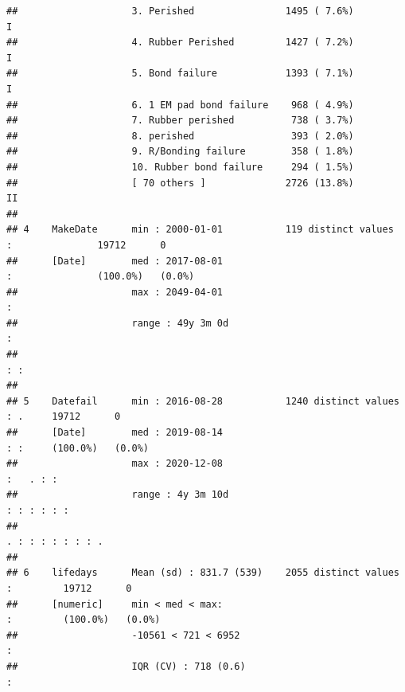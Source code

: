 \documentclass[nofonts,]{tufte-book}
\begin{document}
\begin{verbatim}
##                    3. Perished                1495 ( 7.6%)           I                                         
##                    4. Rubber Perished         1427 ( 7.2%)           I                                         
##                    5. Bond failure            1393 ( 7.1%)           I                                         
##                    6. 1 EM pad bond failure    968 ( 4.9%)                                                     
##                    7. Rubber perished          738 ( 3.7%)                                                     
##                    8. perished                 393 ( 2.0%)                                                     
##                    9. R/Bonding failure        358 ( 1.8%)                                                     
##                    10. Rubber bond failure     294 ( 1.5%)                                                     
##                    [ 70 others ]              2726 (13.8%)           II                                        
## 
## 4    MakeDate      min : 2000-01-01           119 distinct values          :               19712      0        
##      [Date]        med : 2017-08-01                                        :               (100.0%)   (0.0%)   
##                    max : 2049-04-01                                        :                                   
##                    range : 49y 3m 0d                                       :                                   
##                                                                          : :                                   
## 
## 5    Datefail      min : 2016-08-28           1240 distinct values                 : .     19712      0        
##      [Date]        med : 2019-08-14                                                : :     (100.0%)   (0.0%)   
##                    max : 2020-12-08                                          :   . : :                         
##                    range : 4y 3m 10d                                       : : : : : :                         
##                                                                        . : : : : : : : .                       
## 
## 6    lifedays      Mean (sd) : 831.7 (539)    2055 distinct values               :         19712      0        
##      [numeric]     min < med < max:                                              :         (100.0%)   (0.0%)   
##                    -10561 < 721 < 6952                                           :                             
##                    IQR (CV) : 718 (0.6)                                          :                             

\end{verbatim}
\end{document}
